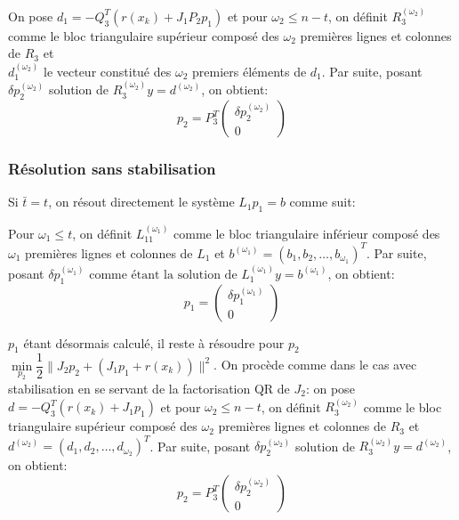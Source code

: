 \documentclass[a4paper,11pt]{article}
\numberwithin{equation}{section}
\def\mfabian#1{{\color{blue} #1}}
\begin{document}
On pose $d_{1} = -Q_3^T(r(x_{k}) + J_1P_{2}p_1)$ et pour $\omega_{2} \leq n-t$, on définit $R_{3}^{(\omega_{2} )}$ comme le bloc triangulaire supérieur composé des $\omega_{2}$ premières lignes et colonnes de $R_{3}$ et \\ $d_{1}^{(\omega_{2})} $ le vecteur constitué des $\omega_{2}$ premiers éléments de $d_{1}$.
Par suite, posant $\delta p_2^{(\omega_{2})}$ solution de $R_{3}^{(\omega_{2})}y =d^{(\omega_{2})}$, on obtient:
\begin{equation}
p_2 = P_3^T\begin{pmatrix} \delta p_2^{(\omega_{2})} \\ 0 \end{pmatrix}
\end{equation}
\subsubsection{Résolution sans stabilisation} \label{resolutionsstab}


Si $\bar{t}=t$, on résout directement le système $L_{1}p_{1}=b$ comme suit:

Pour $\omega_{1} \leq t$, on définit $L_{11}^{(\omega_{1})}$ comme le bloc triangulaire inférieur composé des $\omega_{1}$ premières lignes et colonnes de $L_{1}$ et $b^{(\omega_{1})}= (b_1, b_2, \ldots, b_{\omega_{1}})^T$. Par suite, posant $\delta p_1^{(\omega_{1})} \text{ comme étant la solution de } L_{1}^{(\omega_{1})}y = b^{(\omega_{1})}$, on obtient:
\begin{equation} \label{calculp1}
p_1 = \begin{pmatrix} \delta p_1^{(\omega_{1})} \\ 0 \end{pmatrix}
\end{equation}

$p_1$ étant désormais calculé, il reste à résoudre pour $p_2$ $\underset{p_2}{\min} \dfrac{1}{2}\|J_2p_2 + (J_1p_1 + r(x_{k}))\|^2$. 
On procède comme dans le cas avec stabilisation en se servant de la factorisation QR de $J_2$:
\mfabian{o}n pose $d = -Q_3^T(r(x_{k}) + J_1p_1)$ et pour $\omega_{2} \leq n-t$, on définit $R_{3}^{(\omega_{2} )}$ comme le bloc triangulaire supérieur composé des $\omega_{2}$ premières lignes et colonnes de $R_{3}$ et \\ $d^{(\omega_{2})} = (d_1, d_2, \ldots, d_{\omega_{2}})^T$.
Par suite, posant $\delta p_2^{(\omega_{2})}$ solution de $R_{3}^{(\omega_{2})}y =d^{(\omega_{2})}$, on obtient:
\begin{equation} \label{calculp2}
p_2 = P_3^T\begin{pmatrix} \delta p_2^{(\omega_{2})} \\ 0 \end{pmatrix}
\end{equation}
\end{document}
